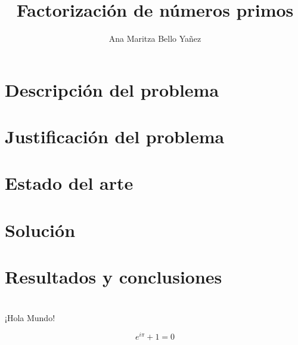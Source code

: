 \documentclass{article}
\begin{document}
\title{Factorización de números primos}
\author{Ana Maritza Bello Yañez}
\maketitle

\section{Descripción del problema}

\section{Justificación del problema}

\section{Estado del arte}

\section{Solución}

\section{Resultados y conclusiones}


\section{}


¡Hola Mundo!

$$ e^{i\pi} + 1 = 0 $$
\end{document}
